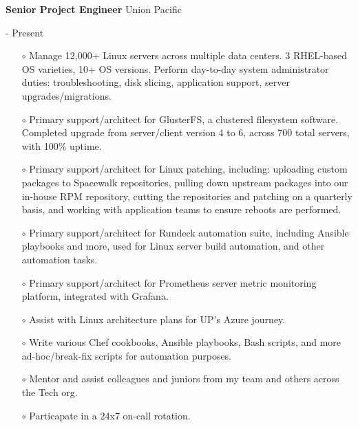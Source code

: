\documentclass[10pt, a4paper]{article}
\begin{document}
\begin{itemize}[leftmargin=0cm]
    \begin{minipage}{0.5\textwidth} %
        \raggedright %
        \item \textbf{Senior Project Engineer} Union Pacific
    \end{minipage}
    \begin{minipage}{0.5\textwidth} %
         \-- Present
    \end{minipage}
    \begin{itemize}[leftmargin=0cm]
        \item[$\circ$] Manage 12,000+ Linux servers across multiple data centers. 3 RHEL-based OS varieties, 10+ OS versions. Perform day-to-day system administrator duties: troubleshooting, disk slicing, application support, server upgrades/migrations.
        \item[$\circ$] Primary support/architect for GlusterFS, a clustered filesystem software. Completed upgrade from server/client version 4 to 6, across 700 total servers, with 100\% uptime.
        \item[$\circ$] Primary support/architect for Linux patching, including: uploading custom packages to Spacewalk repositories, pulling down upstream packages into our in-house RPM repository, cutting the repositories and patching on a quarterly basis, and working with application teams to ensure reboots are performed.
        \item[$\circ$] Primary support/architect for Rundeck automation suite, including Ansible playbooks and more, used for Linux server build automation, and other automation tasks.
        \item[$\circ$] Primary support/architect for Prometheus server metric monitoring platform, integrated with Grafana.
        \item[$\circ$] Assist with Linux architecture plans for UP's Azure journey.
        \item[$\circ$] Write various Chef cookbooks, Ansible playbooks, Bash scripts, and more ad-hoc/break-fix scripts for automation purposes.
        \item[$\circ$] Mentor and assist colleagues and juniors from my team and others across the Tech org.
        \item[$\circ$] Particapate in a 24x7 on-call rotation.
    \end{itemize}
    \begin{minipage}{0.5\textwidth} %

\end{minipage}
\end{itemize}
\end{document}

